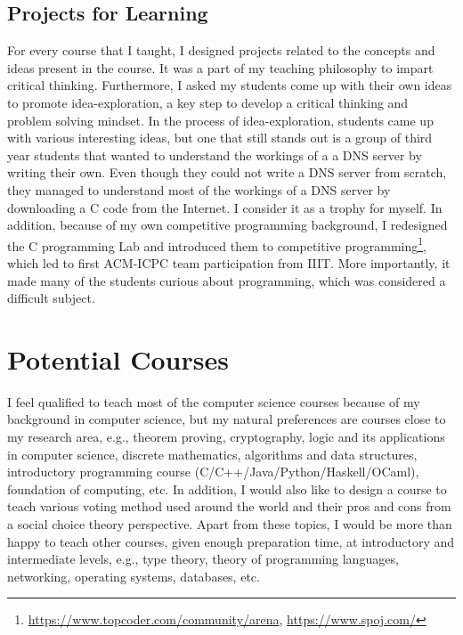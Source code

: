 \documentclass[a4paper]{article}
\begin{document}
\subsection{Projects for Learning}
For every course that I taught, I designed projects related to the concepts 
and ideas present in the course. It was a part of my teaching philosophy to impart 
critical thinking. Furthermore, I asked my students come up with their own ideas to 
promote idea-exploration, a key step to develop a critical thinking and problem solving mindset. 
In the process of idea-exploration, students came up with various interesting 
ideas, but one that still stands out is a group of third year students that wanted 
to understand the workings of a a DNS server by writing their own. Even though they 
could not write a DNS server from scratch, they managed to understand 
most of the workings of a DNS server by downloading a C code from the Internet. 
I consider it as a trophy for myself. In addition, because of my own 
competitive programming background, 
I redesigned the C programming Lab and introduced them to competitive 
programming\footnote{\url{https://www.topcoder.com/community/arena}, 
\url{https://www.spoj.com/}}, which led to first ACM-ICPC team participation 
from IIIT. More importantly, it made many of the students curious about 
programming, which was considered a difficult subject.

\section{Potential Courses}
I feel qualified to teach most of the computer science courses 
because of my background in computer science, but 
my natural preferences are courses close to my research 
area, e.g., theorem proving, cryptography, logic 
and its applications in computer science, discrete 
mathematics, algorithms and data structures, 
introductory programming course (C/C++/Java/Python/Haskell/OCaml),
foundation of computing, etc. 
In addition, I would also like to design a course to teach 
various voting method used around the world and 
their pros and cons from a social choice theory perspective. 
Apart from these topics, I would 
be more than happy to teach other courses, given enough 
preparation time, at introductory and 
intermediate levels, e.g., type theory, theory of programming 
languages, networking, operating systems, databases, etc.
\end{document}
